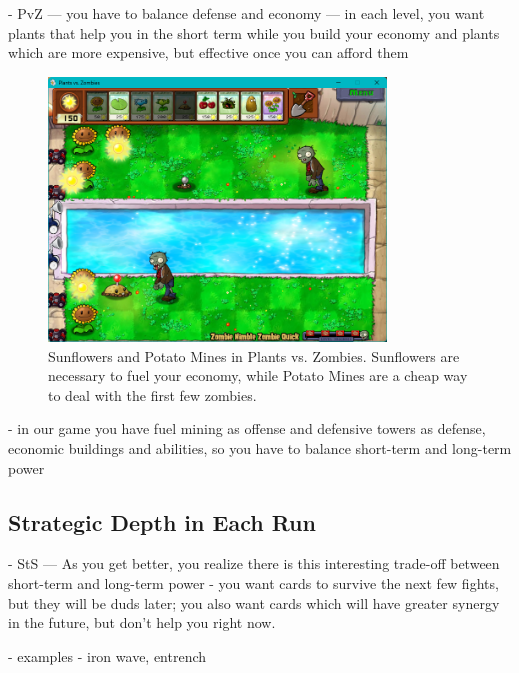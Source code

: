 - PvZ --- you have to balance defense and economy --- in each level, you want plants that help you in the short term while you build your economy and plants which are more expensive, but effective once you can afford them

\begin{figure}
    \centering
    \includegraphics[width=0.8\textwidth]{img/Plants-vs-Zombies-Mines.png}
    \caption{Sunflowers and Potato Mines in Plants vs. Zombies. Sunflowers are necessary to fuel your economy, while Potato Mines are a cheap way to deal with the first few zombies.}
    \label{fig:plants-vs-zombies-mines}
\end{figure}

- in our game you have fuel mining as offense and defensive towers as defense, economic buildings and abilities, so you have to balance short-term and long-term power

\subsection{Strategic Depth in Each Run}

- StS --- As you get better, you realize there is this interesting trade-off between short-term and long-term power - you want cards to survive the next few fights, but they will be duds later; you also want cards which will have greater synergy in the future, but don't help you right now.

- examples - iron wave, entrench


